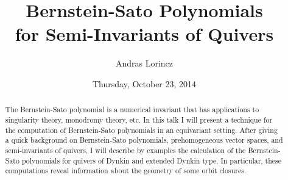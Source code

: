 \documentclass{UAmathtalk}
\author{Andras Lorincz}
\title{Bernstein-Sato Polynomials\\ for Semi-Invariants of Quivers}
\date{Thursday, October 23, 2014}
\begin{document}
\maketitle

\begin{abstract}
The Bernstein-Sato polynomial is a numerical invariant that has applications to singularity theory, monodromy theory, etc.
In this talk I will present a technique for the computation of Bernstein-Sato polynomials in an equivariant setting.
After giving a quick background on Bernstein-Sato polynomials, prehomogeneous vector spaces, and semi-invariants of quivers, I will describe by examples the calculation of the Bernstein-Sato polynomials for quivers of Dynkin and extended Dynkin type.
In particular, these computations reveal information about the geometry of some orbit closures.
\end{abstract}
\end{document}
